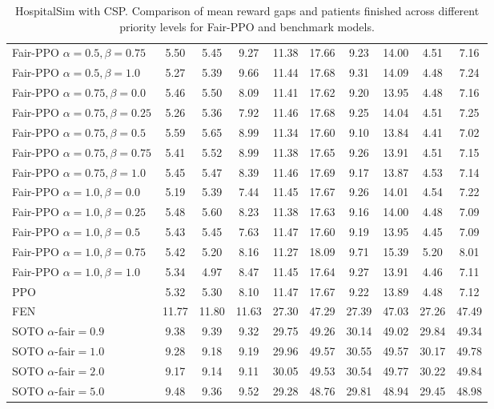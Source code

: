 \begin{table*}
{\begin{tabular}{ l S[table-format=1.2] S[table-format=1.2] S[table-format=1.2] S[table-format=2.2] S[table-format=2.2] S[table-format=2.2] S[table-format=2.2] S[table-format=2.2] S[table-format=2.2] }
Fair-PPO $\alpha=0.5, \beta=0.75$ & 5.50 & 5.45 & 9.27 & 11.38 & 17.66 & 9.23 & 14.00 & 4.51 & 7.16 \\
Fair-PPO $\alpha=0.5, \beta=1.0$ & 5.27 & 5.39 & 9.66 & 11.44 & 17.68 & 9.31 & 14.09 & 4.48 & 7.24 \\
Fair-PPO $\alpha=0.75, \beta=0.0$ & 5.46 & 5.50 & 8.09 & 11.41 & 17.62 & 9.20 & 13.95 & 4.48 & 7.16 \\
Fair-PPO $\alpha=0.75, \beta=0.25$ & 5.26 & 5.36 & 7.92 & 11.46 & 17.68 & 9.25 & 14.04 & 4.51 & 7.25 \\
Fair-PPO $\alpha=0.75, \beta=0.5$ & 5.59 & 5.65 & 8.99 & 11.34 & 17.60 & 9.10 & 13.84 & 4.41 & 7.02 \\
Fair-PPO $\alpha=0.75, \beta=0.75$ & 5.41 & 5.52 & 8.99 & 11.38 & 17.65 & 9.26 & 13.91 & 4.51 & 7.15 \\
Fair-PPO $\alpha=0.75, \beta=1.0$ & 5.45 & 5.47 & 8.39 & 11.46 & 17.69 & 9.17 & 13.87 & 4.53 & 7.14 \\
Fair-PPO $\alpha=1.0, \beta=0.0$ & 5.19 & 5.39 & 7.44 & 11.45 & 17.67 & 9.26 & 14.01 & 4.54 & 7.22 \\
Fair-PPO $\alpha=1.0, \beta=0.25$ & 5.48 & 5.60 & 8.23 & 11.38 & 17.63 & 9.16 & 14.00 & 4.48 & 7.09 \\
Fair-PPO $\alpha=1.0, \beta=0.5$ & 5.43 & 5.45 & 7.63 & 11.47 & 17.60 & 9.19 & 13.95 & 4.45 & 7.09 \\
Fair-PPO $\alpha=1.0, \beta=0.75$ & 5.42 & 5.20 & 8.16 & 11.27 & 18.09 & 9.71 & 15.39 & 5.20 & 8.01 \\
Fair-PPO $\alpha=1.0, \beta=1.0$ & 5.34 & 4.97 & 8.47 & 11.45 & 17.64 & 9.27 & 13.91 & 4.46 & 7.11 \\
\midrule
PPO & 5.32 & 5.30 & 8.10 & 11.47 & 17.67 & 9.22 & 13.89 & 4.48 & 7.12 \\
\midrule
FEN & 11.77 & 11.80 & 11.63 & 27.30 & 47.29 & 27.39 & 47.03 & 27.26 & 47.49 \\
\midrule
SOTO $\alpha\text{-fair}=0.9$ & 9.38 & 9.39 & 9.32 & 29.75 & 49.26 & 30.14 & 49.02 & 29.84 & 49.34 \\
SOTO $\alpha\text{-fair}=1.0$ & 9.28 & 9.18 & 9.19 & 29.96 & 49.57 & 30.55 & 49.57 & 30.17 & 49.78 \\
SOTO $\alpha\text{-fair}=2.0$ & 9.17 & 9.14 & 9.11 & 30.05 & 49.53 & 30.54 & 49.77 & 30.22 & 49.84 \\
SOTO $\alpha\text{-fair}=5.0$ & 9.48 & 9.36 & 9.52 & 29.28 & 48.76 & 29.81 & 48.94 & 29.45 & 48.98 \\
\bottomrule
\end{tabular}}%
\caption{HospitalSim with CSP. Comparison of mean reward gaps and patients finished across different priority levels for Fair-PPO and benchmark models.}
\label{HS-test-results-csp}
\end{table*}